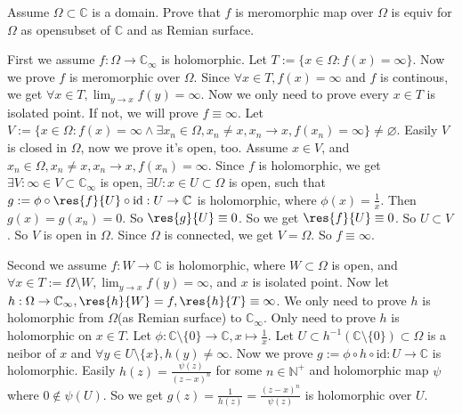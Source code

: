 \documentclass{ctexart}
\newif\ifpreface
\begin{document}
\large
\setlength{\baselineskip}{1.2em}
\ifpreface
    
\newgeometry{left=2cm,right=2cm,top=2cm,bottom=2cm}
\else
{}
\maketitle
\fi
\begin{problem}
  Assume \(\Omega \subset \mathbb{C}\) is a domain. Prove that \(f\) is meromorphic map over \(\Omega\) is equiv for \(\Omega\) as opensubset of \(\mathbb{C}\) and as Remian surface. 
\end{problem}

\begin{solution}
  First we assume \(f:\Omega \to \mathbb{C}_{\infty}\) is holomorphic. Let \(T:=\{x \in \Omega:f(x)=\infty\}\). 
  Now we prove \(f\) is meromorphic over \(\Omega\). 
  Since \(\forall x \in T,f(x)=\infty\) and \(f\) is continous, we get \(\forall x \in T,\lim_{y \to x}f(y)=\infty\). 
  Now we only need to prove every \(x \in T\) is isolated point. If not, we will prove \(f \equiv \infty\). 
  Let \(V:=\{x \in \Omega:f(x)=\infty \wedge \exists x_n \in \Omega,x_n \neq x,x_n \to x,f(x_n)=\infty\} \neq \varnothing\). 
  Easily \(V\) is closed in \(\Omega\), now we prove it's open, too. 
  Assume \(x \in V\), and \(x_n \in \Omega,x_n \neq x,x_n \to x,f(x_n)=\infty\). 
  Since \(f\) is holomorphic, we get \(\exists V:\infty \in V \subset \mathbb{C}_{\infty}\) is open, \(\exists U:x \in U \subset \Omega\) is open, 
  such that \(g:=\phi \circ \res{f}{U} \circ \text{id}:U \to \mathbb{C}\) is holomorphic, where \(\phi(x)=\frac{1}{x}\). 
  Then \(g(x)=g(x_n)=0\). So \(\res{g}{U}\equiv 0\). So we get \(\res{f}{U} \equiv 0\). So \(U \subset V\). 
  So \(V\) is open in \(\Omega\). Since \(\Omega \) is connected, we get \(V=\Omega\). 
  So \(f \equiv \infty\). 

  Second we assume \(f:W \to \mathbb{C}\) is holomorphic, where \(W \subset \Omega\) is open, 
  and \(\forall x \in T:=\Omega \setminus W,\lim_{y \to x}f(y)=\infty\), and \(x\) is isolated point. 
  Now let \(h:\Omega \to \mathbb{C}_{\infty},\res{h}{W}=f,\res{h}{T}\equiv \infty\). 
  We only need to prove \(h\) is holomorphic from \(\Omega\)(as Remian surface) to \(\mathbb{C}_{\infty}\). 
  Only need to prove \( h\) is holomorphic on \(x \in T\). Let \(\phi:\mathbb{C}\setminus \{0\}\to \mathbb{C},x \mapsto \frac{1}{x}\). 
  Let \(U \subset h^{-1}(\mathbb{C} \setminus \{0\}) \subset \Omega\) is a neibor of \(x\) and \(\forall y \in U \setminus \{x\},h(y)\neq \infty\). 
  Now we prove \(g:=\phi \circ h \circ \text{id}:U \to \mathbb{C}\) is holomorphic. 
  Easily \(h(z)= \frac{\psi(z)}{(z-x)^n}\) for some \(n \in \mathbb{N}^+\) and holomorphic map \(\psi\) where \(0 \notin \psi(U)\). 
  So we get \(g(z)=\frac{1}{h(z)}=\frac{(z-x)^n}{\psi(z)}\) is holomorphic over \(U\). 
\end{solution}
\end{document}
